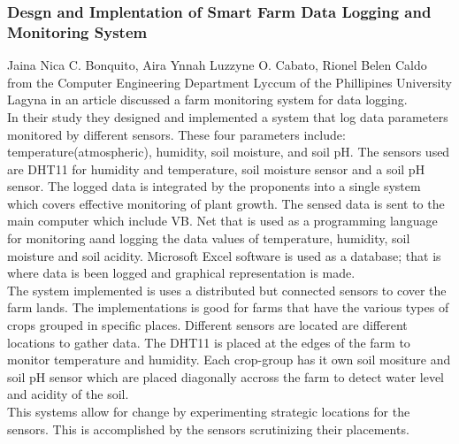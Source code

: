 \documentclass[12pt, a4paper]{article}
\begin{document}
\subsubsection{Desgn and Implentation of Smart Farm Data Logging and Monitoring System}
Jaina Nica C. Bonquito, Aira Ynnah Luzzyne O. Cabato, Rionel Belen Caldo from the Computer Engineering Department Lyccum of the Phillipines University Lagyna in an article discussed a farm monitoring system for data logging.\\
In their study they designed and implemented a system that log data parameters monitored by different sensors. These four parameters include: temperature(atmospheric), humidity, soil moisture, and soil pH. The sensors used are DHT11 for humidity and temperature, soil moisture sensor and a soil pH sensor. The logged data is integrated by the proponents into a single system which covers effective monitoring of plant growth. The sensed data is sent to the main computer which include VB. Net that is used as a programming language for monitoring aand logging the data values of temperature, humidity,  soil moisture and soil acidity. Microsoft Excel software is used as a database; that is where data is been logged and graphical representation is made.\\
The system implemented is uses a distributed but connected sensors to cover the farm lands. The implementations is good for farms that have the various types of crops grouped in specific places. Different sensors are located are different locations to gather data. The DHT11 is placed at the edges of the farm to monitor temperature and humidity. Each crop-group has it own soil mositure and soil pH sensor which are placed diagonally accross the farm to detect water level and acidity of the soil.\\
This systems allow for change by experimenting strategic locations for the sensors. This is accomplished by the sensors scrutinizing their placements. 
  
\end{document}
